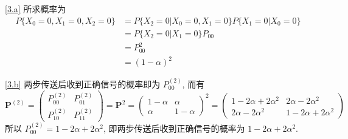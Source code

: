 \documentclass[boxes]{homework}
\begin{document}
\begin{solution}
    \ref{3.a} 所求概率为
    \begin{equation}
        \begin{aligned}
            P\{X_0 = 0, X_1 = 0, X_2 = 0\}
             & = P\{X_2 = 0 \vert X_0 = 0, X_1 = 0\} P\{X_1 = 0 \vert X_0 = 0\} \\
             & = P\{X_2 = 0 \vert X_1 = 0\} P_{00}                              \\
             & = P_{00}^2                                                       \\
             & = \left(1 - \alpha\right)^2
        \end{aligned}
    \end{equation}

    \ref{3.b} 两步传送后收到正确信号的概率即为 $P^{(2)}_{00}$, 而有
    \begin{equation}
        \boldsymbol{P}^{(2)}
        = \begin{pmatrix}
            P^{(2)}_{00} & P^{(2)}_{01} \\
            P^{(2)}_{10} & P^{(2)}_{11}
        \end{pmatrix}
        = \boldsymbol{P}^{2}
        = \begin{pmatrix}
            1 - \alpha & \alpha     \\
            \alpha     & 1 - \alpha
        \end{pmatrix}^2
        = \begin{pmatrix}
            1 - 2\alpha + 2\alpha^2 & 2\alpha - 2\alpha^2     \\
            2\alpha - 2\alpha^2     & 1 - 2\alpha + 2\alpha^2
        \end{pmatrix}
    \end{equation}
    所以 $P^{(2)}_{00} = 1 - 2\alpha + 2\alpha^2$, 即两步传送后收到正确信号的概率为 $1 - 2\alpha + 2\alpha^2$.


\end{solution}
\end{document}
